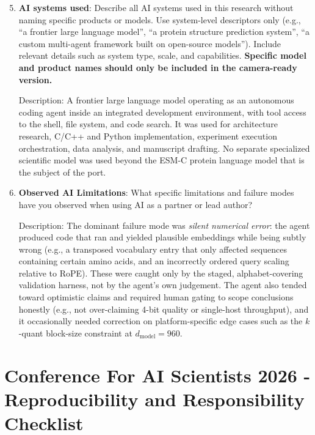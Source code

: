 \documentclass{article}
\begin{document}
\begin{enumerate}
    \setcounter{enumi}{4}

    \item \textbf{AI systems used}: Describe all AI systems used in this research without naming specific products or models. Use system-level descriptors only (e.g., ``a frontier large language model'', ``a protein structure prediction system'', ``a custom multi-agent framework built on open-source models''). Include relevant details such as system type, scale, and capabilities. \textbf{Specific model and product names should only be included in the camera-ready version.}

    Description: A frontier large language model operating as an autonomous coding agent inside an integrated development environment, with tool access to the shell, file system, and code search. It was used for architecture research, C/C++ and Python implementation, experiment execution orchestration, data analysis, and manuscript drafting. No separate specialized scientific model was used beyond the ESM-C protein language model that is the subject of the port.

    \item \textbf{Observed AI Limitations}: What specific limitations and failure modes have you observed when using AI as a partner or lead author?

    Description: The dominant failure mode was \emph{silent numerical error}: the agent produced code that ran and yielded plausible embeddings while being subtly wrong (e.g., a transposed vocabulary entry that only affected sequences containing certain amino acids, and an incorrectly ordered query scaling relative to RoPE). These were caught only by the staged, alphabet-covering validation harness, not by the agent's own judgement. The agent also tended toward optimistic claims and required human gating to scope conclusions honestly (e.g., not over-claiming 4-bit quality or single-host throughput), and it occasionally needed correction on platform-specific edge cases such as the $k$-quant block-size constraint at $d_{\text{model}}=960$.

\end{enumerate}

\newpage

\section*{Conference For AI Scientists 2026 - Reproducibility and Responsibility Checklist}
\label{checklist_reproducibility}
\end{document}
